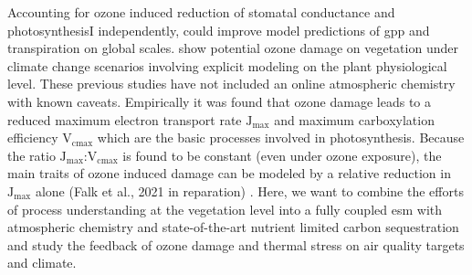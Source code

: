 Accounting for ozone induced reduction of stomatal conductance and photosynthesisI independently, \textcite{BGS:Lombardozzi2012} could improve model predictions of \gls{gpp} and transpiration on global scales. \textcite{BGSD:Franz2020} show potential ozone damage on vegetation under climate change scenarios involving explicit modeling on the plant physiological level. These previous studies have not included an online atmospheric chemistry with known caveats. 
Empirically it was found that ozone damage leads to a reduced maximum electron transport rate $\mathrm{J_{max}}$ and maximum carboxylation efficiency $\mathrm{V_{cmax}}$ \parencite{EJA:Emberson2018} which are the basic processes involved in photosynthesis. Because the ratio $\mathrm{J_{max}}$:$\mathrm{V_{cmax}}$ is found to be constant (even under ozone exposure), the main traits of ozone induced damage can be modeled by a relative reduction in $\mathrm{J_{max}}$ alone (Falk et al., 2021 in reparation) \parencites{BGS:Franz2017}{BGS:Franz2018}.
Here, we want to combine the efforts of process understanding at the vegetation level into a fully coupled \gls{esm} with atmospheric chemistry and state-of-the-art nutrient limited carbon sequestration and study the feedback of ozone damage and thermal stress on air quality targets and climate.






